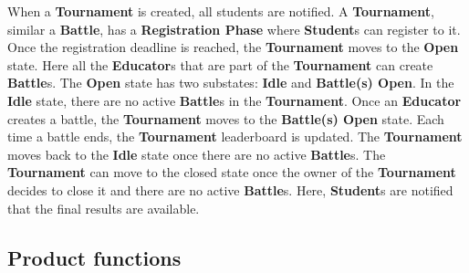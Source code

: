 \documentclass{article}
\begin{document}
When a \textbf{Tournament} is created, all students are notified. A \textbf{Tournament}, similar a \textbf{Battle}, has a \textbf{Registration Phase} where \textbf{Student}s can register to it.
Once the registration deadline is reached, the \textbf{Tournament} moves to the \textbf{Open} state. Here all the \textbf{Educator}s
that are part of the \textbf{Tournament} can create \textbf{Battle}s. The \textbf{Open} state has two substates: \textbf{Idle} 
and \textbf{Battle(s) Open}. In the \textbf{Idle} state, there are no active \textbf{Battle}s in the \textbf{Tournament}. Once an
\textbf{Educator} creates a battle, the \textbf{Tournament} moves to the \textbf{Battle(s) Open} state. Each time a battle ends,
the \textbf{Tournament} leaderboard is updated. The \textbf{Tournament} moves back to the \textbf{Idle} state once there are no active \textbf{Battle}s.
The \textbf{Tournament} can move to the closed state once the owner of the \textbf{Tournament} decides to close it and there are no active \textbf{Battle}s. 
Here, \textbf{Student}s are notified that the final results are available.

\subsection{Product functions}
\end{document}
